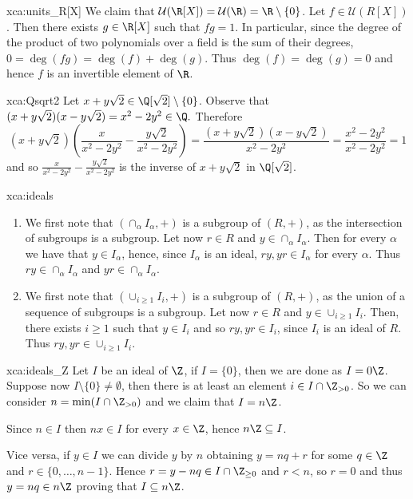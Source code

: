 \begin{sol}{xca:units_R[X]}
     We claim that $\mathcal{U}(\R[X])=\mathcal{U}(\R)=\R\setminus\{0\}$.
     Let $f\in\mathcal{U}(R[X])$. Then there exists $g\in \R[X]$ such that $fg=1$.
     In particular, since the degree of the product of two polynomials over a field is the sum of their degrees,
     $0=\deg(fg)=\deg(f)+\deg(g)$.
     Thus $\deg(f)=\deg(g)=0$ and hence $f$ is an invertible element of $\R$.
 \end{sol}

 \begin{sol}{xca:Qsqrt2}
     Let $x+y\sqrt{2}\in \Q[\sqrt{2}]\setminus\{0\}$.
     Observe that $(x+y\sqrt{2})(x-y\sqrt{2})=x^2-2y^2\in\Q.$
     Therefore 
     \[
     (x+y\sqrt{2})\left(\frac{x}{x^2-2y^2}-\frac{y\sqrt{2}}{x^2-2y^2}\right)=\frac{(x+y\sqrt{2})(x-y\sqrt{2})}{x^2-2y^2}=\frac{x^2-2y^2}{x^2-2y^2}=1
     \]
     and so $\frac{x}{x^2-2y^2}-\frac{y\sqrt{2}}{x^2-2y^2}$
 is the inverse of $x+y\sqrt{2}$ in $\Q[\sqrt{2}]$.
 \end{sol}

 \begin{sol}{xca:ideals}\
     \begin{enumerate}
         \item We first note that $(\cap_\alpha I_\alpha,+)$ is a subgroup of $(R,+)$, as 
         the intersection of subgroups is a subgroup.
             Let now $r\in R$ and $y\in \cap_\alpha I_\alpha$.
             Then for every $\alpha$ we have that $y\in I_\alpha$, hence, since $I_\alpha$ is an ideal, $ry,yr\in I_\alpha$ for every $\alpha$.
             Thus $ry\in \cap_\alpha I_\alpha$ and $yr\in \cap_\alpha I_\alpha$.
         \item    We first note that $(\cup_{i\geq 1} I_i,+)$ is a subgroup of $(R,+)$, as  
          the union of a sequence of subgroups is a subgroup.
          Let now $r\in R$ and $y\in \cup_{i\geq 1} I_i$.
          Then, there exists $i\geq 1$ such that $y\in I_i$
          and so $ry,yr\in I_i$, since $I_i$ is an ideal of $R$. Thus $ry,yr\in \cup_{i\geq 1} I_i$.
     \end{enumerate}
 \end{sol}

 \begin{sol}{xca:ideals_Z}
     Let $I$ be an ideal of $\Z$, if $I=\{0\}$, then we are done as $I=0\Z$.
     Suppose now $I\setminus\{0\}\neq \emptyset$, then there is at least an element $i\in I\cap \Z_{>0}$.
     So we can consider $n=\min(I\cap \Z_{>0})$ and we claim that $I=n\Z$.

     Since $n\in I$ then $nx\in I$ for every $x\in \Z$, hence $n\Z\subseteq I$.

     Vice versa, if $y\in I$ we can divide $y$ by $n$ obtaining $y=nq+r$ for some $q\in \Z$ and $r\in\{0,\dots, n-1\}$.
     Hence $r=y-nq\in I\cap \Z_{\geq 0}$ and $r<n$, so $r=0$ and thus $y=nq\in n\Z$ proving that $I\subseteq n\Z$.
 \end{sol}

